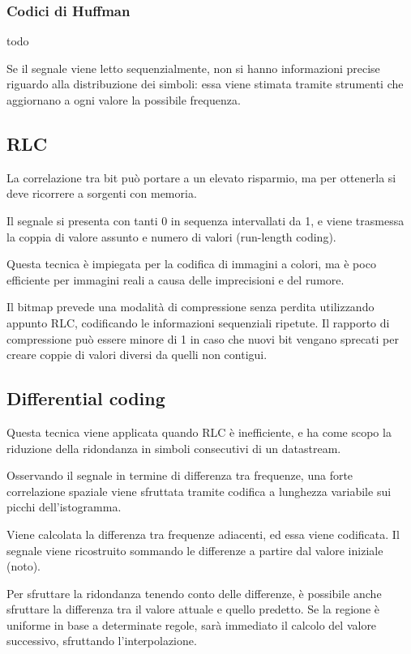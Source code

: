\subsubsection{Codici di Huffman}
todo

Se il segnale viene letto sequenzialmente, non si hanno informazioni precise riguardo alla distribuzione dei simboli: essa viene stimata tramite strumenti che aggiornano a ogni valore la possibile frequenza.

\subsection{RLC}
La correlazione tra bit può portare a un elevato risparmio, ma per ottenerla si deve ricorrere a sorgenti con memoria. 

Il segnale si presenta con tanti 0 in sequenza intervallati da 1, e viene trasmessa la coppia di valore assunto e numero di valori (run-length coding). 

Questa tecnica è impiegata per la codifica di immagini a colori, ma è poco efficiente per immagini reali a causa delle imprecisioni e del rumore. 

Il bitmap prevede una modalità di compressione senza perdita utilizzando appunto RLC, codificando le informazioni sequenziali ripetute. Il rapporto di compressione può essere minore di 1 in caso che nuovi bit vengano sprecati per creare coppie di valori diversi da quelli non contigui.

\subsection{Differential coding}
Questa tecnica viene applicata quando RLC è inefficiente, e ha come scopo la riduzione della ridondanza in simboli consecutivi di un datastream.

Osservando il segnale in termine di differenza tra frequenze, una forte correlazione spaziale viene sfruttata tramite codifica a lunghezza variabile sui picchi dell'istogramma. 

Viene calcolata la differenza tra frequenze adiacenti, ed essa viene codificata. Il segnale viene ricostruito sommando le differenze a partire dal valore iniziale (noto).

Per sfruttare la ridondanza tenendo conto delle differenze, è possibile anche sfruttare la differenza tra il valore attuale e quello predetto. Se la regione è uniforme in base a determinate regole, sarà immediato il calcolo del valore successivo, sfruttando l'interpolazione. 

